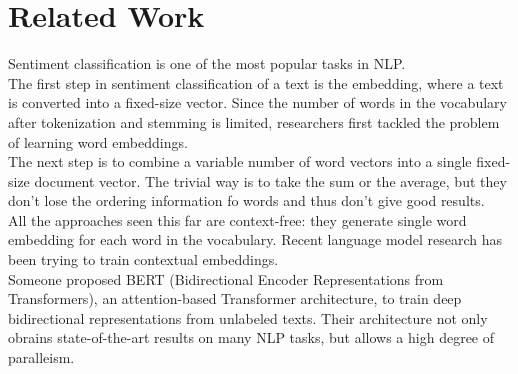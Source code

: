 \section{Related Work}

Sentiment classification is one of the most popular tasks in NLP.\\
The first step in sentiment classification of a text is the embedding, where a
text is converted into a fixed-size vector. Since the number of words in the
vocabulary after tokenization and stemming is limited, researchers first
tackled the problem of learning word embeddings.\\
The next step is to combine a variable number of word vectors into a single
fixed-size document vector. The trivial way is to take the sum or the average,
but they don't lose the ordering information fo words and thus don't give good
results.\\
All the approaches seen this far are context-free: they generate single word
embedding for each word in the vocabulary. Recent language model research has
been trying to train contextual embeddings.\\
Someone proposed BERT (Bidirectional Encoder Representations from Transformers),
an attention-based Transformer architecture, to train deep bidirectional
representations from unlabeled texts. Their architecture not only obrains
state-of-the-art results on many NLP tasks, but allows a high degree of
paralleism.
